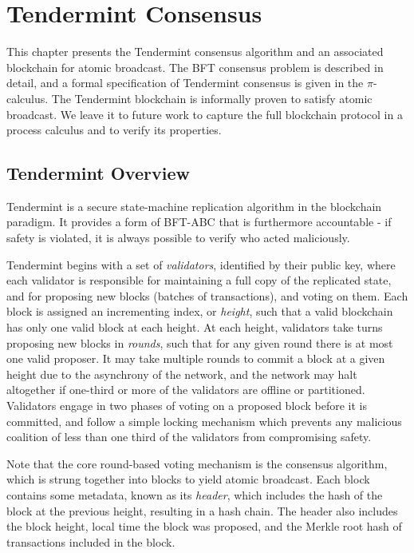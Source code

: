 \chapter{Tendermint Consensus}
\label{ch:tendermint}

This chapter presents the Tendermint consensus algorithm 
and an associated blockchain for atomic broadcast.
The BFT consensus problem is described in detail, 
and a formal specification of Tendermint consensus is given in the $\pi$-calculus.
The Tendermint blockchain is informally proven to satisfy atomic broadcast.
We leave it to future work to capture the full blockchain protocol in 
a process calculus and to verify its properties.

\section{Tendermint Overview}

Tendermint is a secure state-machine replication algorithm in the blockchain paradigm.
It provides a form of BFT-ABC that is furthermore accountable - 
if safety is violated, it is always possible to verify who acted maliciously.

Tendermint begins with a set of \emph{validators}, identified by their public key,
where each validator is responsible for maintaining a full copy of the replicated state,
and for proposing new blocks (batches of transactions), and voting on them.
Each block is assigned an incrementing index, or \emph{height}, 
such that a valid blockchain has only one valid block at each height.
At each height, validators take turns proposing new blocks in \emph{rounds}, 
such that for any given round there is at most one valid proposer.
It may take multiple rounds to commit a block at a given height due to the asynchrony of the network,
and the network may halt altogether if one-third or more of the validators are offline or partitioned.
Validators engage in two phases of voting on a proposed block before it is committed, 
and follow a simple locking mechanism which prevents any malicious coalition of less than
one third of the validators from compromising safety.

Note that the core round-based voting mechanism is the consensus algorithm, 
which is strung together into blocks to yield atomic broadcast.
Each block contains some metadata, known as its \emph{header}, 
which includes the hash of the block at the previous height, resulting in a hash chain.
The header also includes the block height, local time the block was proposed, 
and the Merkle root hash of transactions included in the block.

